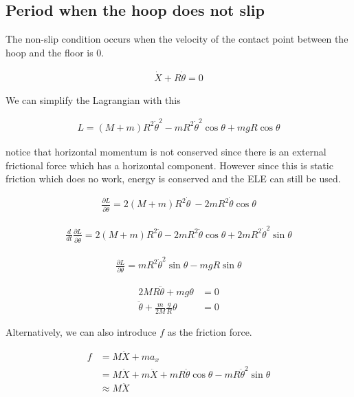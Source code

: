 \documentclass{article}
\begin{document}
\subsection{Period when the hoop does not slip}

The non-slip condition occurs when the velocity of the contact point between the hoop and the floor is $0$.

\begin{align*}
\dot X + R\dot\theta = 0
\end{align*}

We can simplify the Lagrangian with this

\begin{align*}
L = (M+m)R^2\dot\theta^2 - mR^2\dot\theta^2\cos\theta + mgR\cos\theta
\end{align*}

notice that horizontal momentum is not conserved since there is an external frictional force which has a horizontal component. However since this is static friction which does no work, energy is conserved and the ELE can still be used.

\begin{align*}
\frac{\partial L}{\partial \dot\theta} = 2(M+m)R^2\dot\theta\ - 2mR^2\dot\theta\cos\theta
\end{align*}

\begin{align*}
\frac{d}{dt} \frac{\partial L}{\partial \dot\theta} = 2(M+m)R^2\ddot\theta - 2mR^2\ddot\theta\cos\theta + 2mR^2\dot\theta^2\sin\theta
\end{align*}

\begin{align*}
\frac{\partial L}{\partial \theta} = m  R^2\dot\theta^2\sin\theta - mgR\sin\theta
\end{align*}

\begin{align*}
2MR\ddot\theta + mg\theta &= 0 \\
\ddot\theta + \frac{m}{2M}\frac{g}{R}\theta &= 0
\end{align*}

Alternatively, we can also introduce $f$ as the friction force.

\begin{align*}
f &= M\ddot{X} + ma_x \\
&=M\ddot{X} + m\ddot{X} + mR\ddot\theta\cos\theta - mR\ddot\theta^2\sin\theta \\
&\approx M\ddot{X}
\end{align*}
\end{document}
